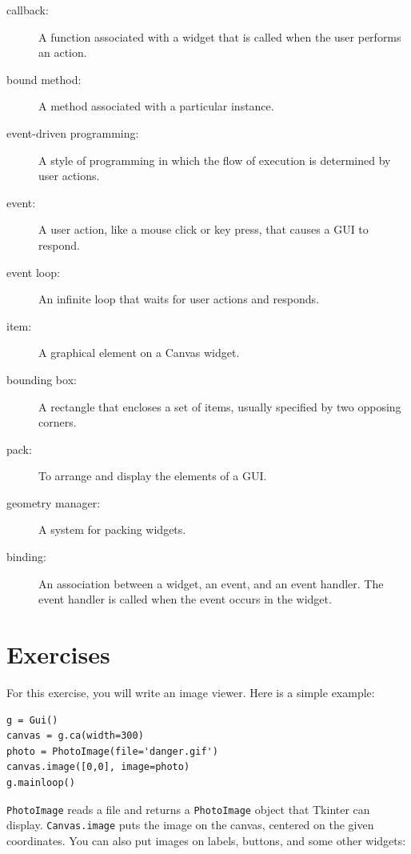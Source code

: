 \documentclass[10pt]{book}
\begin{document}
{\begin{description}
\item[callback:] A function associated with a widget that is
called when the user performs an action.

\item[bound method:] A method associated with a particular instance.

\item[event-driven programming:] A style of programming in which
the flow of execution is determined by user actions.

\item[event:] A user action, like a mouse click or key press, that
causes a GUI to respond.

\item[event loop:] An infinite loop that waits for user actions
and responds.

\item[item:] A graphical element on a Canvas widget.

\item[bounding box:] A rectangle that encloses a set of items,
usually specified by two opposing corners.

\item[pack:] To arrange and display the elements of a GUI.

\item[geometry manager:] A system for packing widgets.

\item[binding:] An association between a widget, an event, and
an event handler.  The event handler is called when the event
occurs in the widget.

\end{description}


\section{Exercises}

\begin{ex}

For this exercise, you will write an image viewer.  Here is
a simple example:

\beforeverb
\begin{verbatim}
g = Gui()
canvas = g.ca(width=300)
photo = PhotoImage(file='danger.gif')
canvas.image([0,0], image=photo)
g.mainloop()
\end{verbatim}
\afterverb
%
{\tt PhotoImage} reads a file and returns a {\tt PhotoImage} object
that Tkinter can display.  {\tt Canvas.image} puts the image on the
canvas, centered on the given coordinates.  You can also put images on
labels, buttons, and some other widgets:


\end{ex}}
\end{document}
